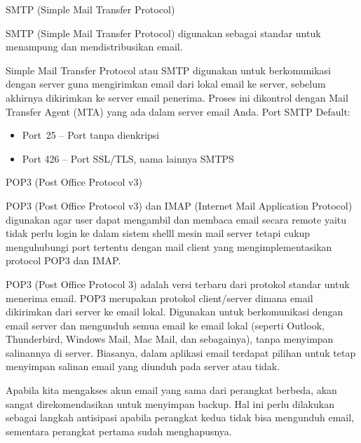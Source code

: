 \documentclass{wileySix}
\begin{document}
\noindent 
\begin{myEnumerate}
	\item SMTP (Simple Mail Transfer Protocol) \par
	SMTP (Simple Mail Transfer Protocol) digunakan sebagai standar untuk menampung dan mendistribusikan email. \par
	\vspace{12pt}
	Simple Mail Transfer Protocol atau SMTP digunakan untuk berkomunikasi dengan server guna mengirimkan email dari lokal email ke server, sebelum akhirnya dikirimkan ke server email penerima. Proses ini dikontrol dengan Mail Transfer Agent (MTA) yang ada dalam server email Anda. Port SMTP Default: \par
	\noindent 
	\begin{itemize}
		\item Port~25 –  Port tanpa dienkripsi \par
		\noindent 
		\item Port 426 – Port SSL/TLS, nama lainnya SMTPS\end{itemize}
	\par
	\vspace{12pt}
	\noindent 
	\item POP3 (Post Office Protocol v3) \par
	POP3 (Post Office Protocol v3) dan IMAP (Internet Mail Application Protocol) digunakan agar user dapat mengambil dan membaca email secara remote yaitu tidak perlu login ke dalam sistem shelll mesin mail server tetapi cukup menguhubungi port tertentu dengan mail client yang mengimplementasikan protocol POP3 dan IMAP. \par
	POP3 (Post Office Protocol 3) adalah versi terbaru dari protokol standar untuk menerima email. POP3 merupakan protokol client/server dimana email dikirimkan dari server ke email lokal. Digunakan untuk berkomunikasi dengan email server dan mengunduh semua email ke email lokal (seperti Outlook, Thunderbird, Windows Mail, Mac Mail, dan sebagainya), tanpa menyimpan salinannya di server. Biasanya, dalam aplikasi email terdapat pilihan untuk tetap menyimpan salinan email yang diunduh pada server atau tidak. \par
	\vspace{12pt}
	Apabila kita mengakses akun email yang sama dari perangkat berbeda, akan sangat direkomendasikan untuk menyimpan backup. Hal ini perlu dilakukan sebagai langkah antisipasi apabila perangkat kedua tidak bisa mengunduh email, sementara perangkat pertama sudah menghapusnya. \par

\end{myEnumerate}
\end{document}
